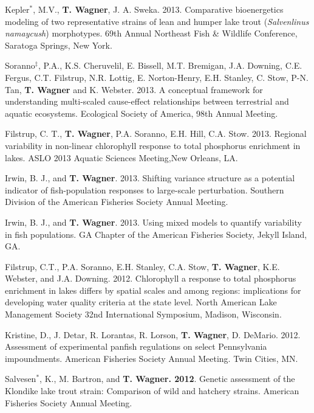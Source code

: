 \documentclass[10pt]{article}
\begin{document}
\begin{flushleft}
\begin{etaremune}
\item Kepler$^*$, M.V.,  {\bf T. Wagner}, J. A. Sweka. 2013. Comparative bioenergetics modeling of two representative strains of lean and humper lake trout (\emph{Salvenlinus namaycush}) morphotypes. 69th Annual Northeast Fish \& Wildlife Conference, Saratoga Springs, New York. 

\item Soranno$^\ddagger$, P.A., K.S. Cheruvelil, E. Bissell, M.T. Bremigan, J.A. Downing, C.E. Fergus, C.T. Filstrup, N.R. Lottig, E. Norton-Henry, E.H. Stanley, C. Stow, P-N. Tan, {\bf T. Wagner} and K. Webster. 2013. A conceptual framework for understanding multi-scaled cause-effect relationships between terrestrial and aquatic ecosystems. Ecological Society of America, 98th Annual Meeting.

\item Filstrup, C. T., {\bf T. Wagner}, P.A. Soranno, E.H. Hill, C.A. Stow. 2013. Regional variability in non-linear chlorophyll response to total phosphorus enrichment in lakes. ASLO 2013 Aquatic Sciences Meeting,New Orleans, LA.

\item Irwin, B. J., and {\bf T. Wagner}. 2013. Shifting variance structure as a potential indicator of fish-population responses to large-scale perturbation. Southern Division of the American Fisheries Society Annual Meeting.

\item Irwin, B. J., and {\bf T. Wagner}. 2013. Using mixed models to quantify variability in fish populations. GA Chapter of the American Fisheries Society, Jekyll Island, GA.


\item Filstrup, C.T., P.A. Soranno, E.H. Stanley, C.A. Stow, {\bf T. Wagner}, K.E. Webster, and J.A. Downing. 2012. Chlorophyll a response to total phosphorus enrichment in lakes differs by spatial scales and among regions: implications for developing water quality criteria at the state level. North American Lake Management Society 32nd International Symposium, Madison, Wisconsin. 

\item Kristine, D., J. Detar, R. Lorantas, R. Lorson,  {\bf T. Wagner}, D. DeMario. 2012. Assessment of experimental panfish regulations on select Pennsylvania impoundments. American Fisheries Society Annual Meeting. Twin Cities, MN.

\item Salvesen$^*$, K., M. Bartron, and {\bf T. Wagner. 2012}. Genetic assessment of the Klondike lake trout strain: Comparison of wild and hatchery strains. American Fisheries Society Annual Meeting. 


\end{etaremune}
\end{flushleft}
\end{document}
